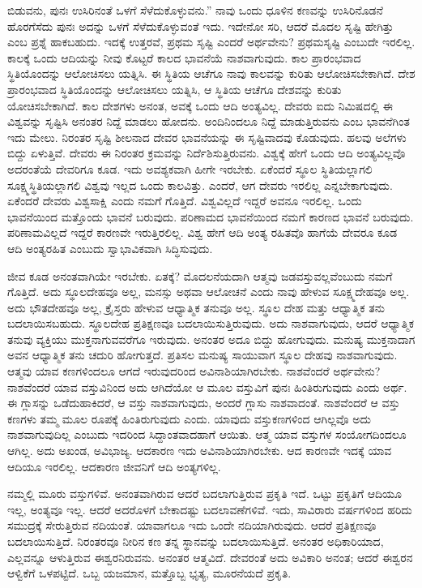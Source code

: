 ಬಿಡುವನು, ಪುನಃ ಉಸಿರಿನಂತೆ ಒಳಗೆ ಸೆಳೆದುಕೊಳ್ಳುವನು.” ನಾವು ಒಂದು ಧೂಳಿನ ಕಣವನ್ನು ಉಸಿರಿನೊಡನೆ ಹೊರಗೆಸೆದು ಪುನಃ ಅದನ್ನು ಒಳಗೆ ಸೆಳೆದುಕೊಳ್ಳುವಂತೆ ಇದು. ಇದೇನೋ ಸರಿ, ಆದರೆ ಮೊದಲ ಸೃಷ್ಟಿ ಹೇಗಿತ್ತು ಎಂಬ ಪ್ರಶ್ನೆ ಹಾಕಬಹುದು. ಇದಕ್ಕೆ ಉತ್ತರವೆ, ಪ್ರಥಮ ಸೃಷ್ಟಿ ಎಂದರೆ ಅರ್ಥವೇನು? ಪ್ರಥಮಸೃಷ್ಟಿ ಎಂಬುದೇ ಇರಲಿಲ್ಲ. ಕಾಲಕ್ಕೆ ಒಂದು ಆದಿಯನ್ನು ನೀವು ಕೊಟ್ಟರೆ ಕಾಲದ ಭಾವನೆಯೆ ನಾಶವಾಗುವುದು. ಕಾಲ ಪ್ರಾರಂಭವಾದ ಸ್ಥಿತಿಯೊಂದನ್ನು ಆಲೋಚಿಸಲು ಯತ್ನಿಸಿ. ಈ ಸ್ಥಿತಿಯ ಆಚೆಗೂ ನಾವು ಕಾಲವನ್ನು ಕುರಿತು ಆಲೋಚಿಸಬೇಕಾಗಿದೆ. ದೇಶ ಪ್ರಾರಂಭವಾದ ಸ್ಥಿತಿಯೊಂದನ್ನು ಆಲೋಚಿಸಲು ಯತ್ನಿಸಿ, ಆ ಸ್ಥಿತಿಯ ಆಚೆಗೂ ದೇಶವನ್ನು ಕುರಿತು ಯೋಚಿಸಬೇಕಾಗಿದೆ. ಕಾಲ ದೇಶಗಳು ಅನಂತ, ಅವಕ್ಕೆ ಒಂದು ಆದಿ ಅಂತ್ಯವಿಲ್ಲ. ದೇವರು ಐದು ನಿಮಿಷದಲ್ಲಿ ಈ ವಿಶ್ವವನ್ನು ಸೃಷ್ಟಿಸಿ ಅನಂತರ ನಿದ್ದೆ ಮಾಡಲು ಹೋದನು. ಅಂದಿನಿಂದಲೂ ನಿದ್ದೆ ಮಾಡುತ್ತಿರುವನು ಎಂಬ ಭಾವನೆಗಿಂತ ಇದು ಮೇಲು. ನಿರಂತರ ಸೃಷ್ಟಿ ಶೀಲನಾದ ದೇವರ ಭಾವನೆಯನ್ನು ಈ ಸೃಷ್ಟಿವಾದವು ಕೊಡುವುದು. ಹಲವು ಅಲೆಗಳು ಬಿದ್ದು ಏಳುತ್ತಿವೆ. ದೇವರು ಈ ನಿರಂತರ ಕ್ರಮವನ್ನು ನಿರ್ದೆಶಿಸುತ್ತಿರುವನು. ವಿಶ್ವಕ್ಕೆ ಹೇಗೆ ಒಂದು ಆದಿ ಅಂತ್ಯವಿಲ್ಲವೊ ಅದರಂತೆಯೆ ದೇವರಿಗೂ ಕೂಡ. ಇದು ಅವಶ್ಯಕವಾಗಿ ಹೀಗೇ ಇರಬೇಕು. ಏಕೆಂದರೆ ಸ್ಥೂಲ ಸ್ಥಿತಿಯಲ್ಲಾಗಲಿ ಸೂಕ್ಷ್ಮಸ್ಥಿತಿಯಲ್ಲಾಗಲಿ ವಿಶ್ವವು ಇಲ್ಲದ ಒಂದು ಕಾಲವಿತ್ತು. ಎಂದರೆ, ಆಗ ದೇವರು ಇರಲಿಲ್ಲ ಎನ್ನಬೇಕಾಗುವುದು. ಏಕೆಂದರೆ ದೇವರು ವಿಶ್ವಸಾಕ್ಷಿ ಎಂದು ನಮಗೆ ಗೊತ್ತಿದೆ. ವಿಶ್ವವಿಲ್ಲದೆ ಇದ್ದರೆ ಅವನೂ ಇರಲಿಲ್ಲ. ಒಂದು ಭಾವನೆಯಿಂದ ಮತ್ತೊಂದು ಭಾವನೆ ಬರುವುದು. ಪರಿಣಾಮದ ಭಾವನೆಯಿಂದ ನಮಗೆ ಕಾರಣದ ಭಾವನೆ ಬರುವುದು. ಪರಿಣಾಮವಿಲ್ಲದೆ ಇದ್ದರೆ ಕಾರಣವೇ ಇರುತ್ತಿರಲಿಲ್ಲ. ವಿಶ್ವ ಹೇಗೆ ಆದಿ ಅಂತ್ಯ ರಹಿತವೊ ಹಾಗೆಯೆ ದೇವರೂ ಕೂಡ ಆದಿ ಅಂತ್ಯರಹಿತ ಎಂಬುದು ಸ್ವಾಭಾವಿಕವಾಗಿ ಸಿದ್ಧಿಸುವುದು.

ಜೀವ ಕೂಡ ಅನಂತವಾಗಿಯೇ ಇರಬೇಕು. ಏತಕ್ಕೆ? ಮೊದಲನೆಯದಾಗಿ ಆತ್ಮವು ಜಡವಸ್ತುವಲ್ಲವೆಂಬುದು ನಮಗೆ ಗೊತ್ತಿದೆ. ಅದು ಸ್ಥೂಲದೇಹವೂ ಅಲ್ಲ, ಮನಸ್ಸು ಅಥವಾ ಆಲೋಚನೆ ಎಂದು ನಾವು ಹೇಳುವ ಸೂಕ್ಷ್ಮದೇಹವೂ ಅಲ್ಲ. ಅದು ಭೌತದೇಹವೂ ಅಲ್ಲ, ಕ್ರೈಸ್ತರು ಹೇಳುವ ಆಧ್ಯಾತ್ಮಿಕ ತನುವೂ ಅಲ್ಲ. ಸ್ಥೂಲ ದೇಹ ಮತ್ತು ಆಧ್ಯಾತ್ಮಿಕ ತನು ಬದಲಾಯಿಸಬಹುದು. ಸ್ಥೂಲದೇಹ ಪ್ರತಿಕ್ಷಣವೂ ಬದಲಾಯಿಸುತ್ತಿರುವುದು. ಅದು ನಾಶವಾಗುವುದು, ಆದರೆ ಆಧ್ಯಾತ್ಮಿಕ ತನುವು ವ್ಯಕ್ತಿಯು ಮುಕ್ತನಾಗುವವರೆಗೂ ಇರುವುದು. ಅನಂತರ ಅದೂ ಬಿದ್ದು ಹೋಗುವುದು. ಮನುಷ್ಯ ಮುಕ್ತನಾದಾಗ ಅವನ ಆಧ್ಯಾತ್ಮಿಕ ತನು ಚದುರಿ ಹೋಗುತ್ತದೆ. ಪ್ರತಿಸಲ ಮನುಷ್ಯ ಸಾಯುವಾಗ ಸ್ಥೂಲ ದೇಹವು ನಾಶವಾಗುವುದು. ಆತ್ಮವು ಯಾವ ಕಣಗಳಿಂದಲೂ ಆಗದೆ ಇರುವುದರಿಂದ ಅವಿನಾಶಿಯಾಗಿರಬೇಕು. ನಾಶವೆಂದರೆ ಅರ್ಥವೇನು? ನಾಶವೆಂದರೆ ಯಾವ ವಸ್ತುವಿನಿಂದ ಅದು ಆಗಿದೆಯೋ ಆ ಮೂಲ ವಸ್ತುವಿಗೆ ಪುನಃ ಹಿಂತಿರುಗುವುದು ಎಂದು ಅರ್ಥ. ಈ ಗ್ಲಾಸನ್ನು ಒಡೆದುಹಾಕಿದರೆ, ಆ ವಸ್ತು ನಾಶವಾಗುವುದು, ಅಂದರೆ ಗ್ಲಾಸು ನಾಶವಾದಂತೆ. ನಾಶವೆಂದರೆ ಆ ವಸ್ತು ಕಣಗಳು ತಮ್ಮ ಮೂಲ ರೂಪಕ್ಕೆ ಹಿಂತಿರುಗುವುದು ಎಂದು. ಯಾವುದು ವಸ್ತುಕಣಗಳಿಂದ ಆಗಿಲ್ಲವೊ ಅದು ನಾಶವಾಗುವುದಿಲ್ಲ ಎಂಬುದು ಇದರಿಂದ ಸಿದ್ದಾಂತವಾದಹಾಗೆ ಆಯಿತು. ಆತ್ಮ ಯಾವ ವಸ್ತುಗಳ ಸಂಯೋಗದಿಂದಲೂ ಆಗಿಲ್ಲ. ಅದು ಅಖಂಡ, ಅವಿಭಾಜ್ಯ. ಆದಕಾರಣ ಇದು ಅವಿನಾಶಿಯಾಗಿರಬೇಕು. ಆದ ಕಾರಣವೇ ಇದಕ್ಕೆ ಯಾವ ಆದಿಯೂ ಇರಲಿಲ್ಲ. ಆದಕಾರಣ ಜೀವನಿಗೆ ಆದಿ ಅಂತ್ಯಗಳಿಲ್ಲ.

ನಮ್ಮಲ್ಲಿ ಮೂರು ವಸ್ತುಗಳಿವೆ. ಅನಂತವಾಗಿರುವ ಆದರೆ ಬದಲಾಗುತ್ತಿರುವ ಪ್ರಕೃತಿ ಇದೆ. ಒಟ್ಟು ಪ್ರಕೃತಿಗೆ ಆದಿಯೂ ಇಲ್ಲ, ಅಂತ್ಯವೂ ಇಲ್ಲ. ಆದರೆ ಅದರೊಳಗೆ ಬೇಕಾದಷ್ಟು ಬದಲಾವಣೆಗಳಿವೆ. ಇದು, ಸಾವಿರಾರು ವರ್ಷಗಳಿಂದ ಹರಿದು ಸಮುದ್ರಕ್ಕೆ ಸೇರುತ್ತಿರುವ ನದಿಯಂತೆ. ಯಾವಾಗಲೂ ಇದು ಒಂದೇ ನದಿಯಾಗಿರುವುದು. ಆದರೆ ಪ್ರತಿಕ್ಷಣವೂ ಬದಲಾಯಿಸುತ್ತಿದೆ. ನಿರಂತರವೂ ನೀರಿನ ಕಣ ತನ್ನ ಸ್ಥಾನವನ್ನು ಬದಲಾಯಿಸುತ್ತಿದೆ. ಅನಂತರ ಅಧಿಕಾರಿಯಾದ, ಎಲ್ಲವನ್ನೂ ಆಳುತ್ತಿರುವ ಈಶ್ವರನಿರುವನು. ಅನಂತರ ಆತ್ಮವಿದೆ. ದೇವರಂತೆ ಅದು ಅವಿಕಾರಿ ಅನಂತ; ಆದರೆ ಈಶ್ವರನ ಆಳ್ವಿಕೆಗೆ ಒಳಪಟ್ಟಿದೆ. ಒಬ್ಬ ಯಜಮಾನ, ಮತ್ತೊಬ್ಬ ಭೃತ್ಯ, ಮೂರನೆಯದೆ ಪ್ರಕೃತಿ.

